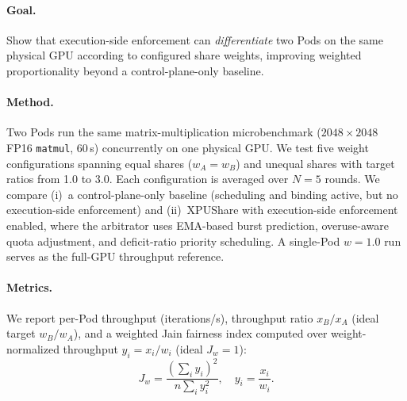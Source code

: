 \documentclass[runningheads,a4paper]{llncs}
\begin{document}
\paragraph{Goal.}
Show that execution-side enforcement can \emph{differentiate} two Pods on
the same physical GPU according to configured share weights, improving
weighted proportionality beyond a control-plane-only baseline.

\paragraph{Method.}
Two Pods run the same matrix-multiplication microbenchmark ($2048\times2048$ FP16 \texttt{matmul}, 60\,s) concurrently on one physical GPU. We test five
weight configurations spanning equal shares ($w_A{=}w_B$) and unequal shares
with target ratios from 1.0 to 3.0. Each configuration is averaged over
$N{=}5$ rounds. We compare (i)~a control-plane-only baseline
(scheduling and binding active, but no execution-side enforcement) and (ii)~XPUShare
with execution-side enforcement enabled, where the arbitrator uses
EMA-based burst prediction, overuse-aware quota adjustment, and
deficit-ratio priority scheduling. A single-Pod $w{=}1.0$ run serves as
the full-GPU throughput reference.

\paragraph{Metrics.}
We report per-Pod throughput (iterations/s), throughput ratio $x_B/x_A$
(ideal target $w_B/w_A$), and a weighted Jain fairness index computed over
weight-normalized throughput $y_i = x_i/w_i$ (ideal $J_w{=}1$):
\begin{equation}
J_w = \frac{\left(\sum_i y_i\right)^2}{n \sum_i y_i^2}, \quad y_i = \frac{x_i}{w_i}.
\end{equation}
\end{document}
